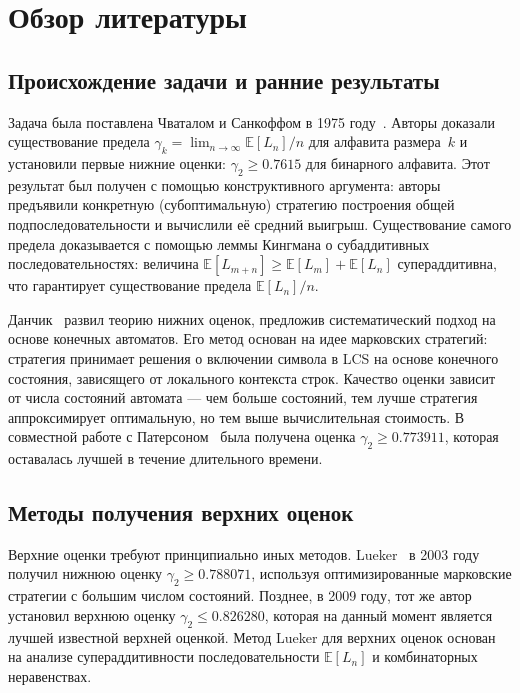 \documentclass[12pt,a4paper]{article}
\begin{document}
\section{Обзор литературы}

\subsection{Происхождение задачи и ранние результаты}

Задача была поставлена Чваталом и Санкоффом в 1975 году~\cite{chvatal1975}.
Авторы доказали существование предела $\gamma_k = \lim_{n \to \infty} \mathbb{E}[L_n]/n$ для алфавита размера~$k$ и установили первые нижние оценки: $\gamma_2 \geq 0.7615$ для бинарного алфавита.
Этот результат был получен с помощью конструктивного аргумента: авторы предъявили конкретную (субоптимальную) стратегию построения общей подпоследовательности и вычислили её средний выигрыш.
Существование самого предела доказывается с помощью леммы Кингмана о субаддитивных последовательностях: величина $\mathbb{E}[L_{m+n}] \geq \mathbb{E}[L_m] + \mathbb{E}[L_n]$ суперадди\-тивна, что гарантирует существование предела $\mathbb{E}[L_n]/n$.

Данчик~\cite{dancik1994} развил теорию нижних оценок, предложив систематический подход на основе конечных автоматов.
Его метод основан на идее марковских стратегий: стратегия принимает решения о включении символа в LCS на основе конечного состояния, зависящего от локального контекста строк.
Качество оценки зависит от числа состояний автомата --- чем больше состояний, тем лучше стратегия аппроксимирует оптимальную, но тем выше вычислительная стоимость.
В совместной работе с Патерсоном~\cite{dancik1995} была получена оценка $\gamma_2 \geq 0.773911$, которая оставалась лучшей в течение длительного времени.

\subsection{Методы получения верхних оценок}

Верхние оценки требуют принципиально иных методов.
Lueker~\cite{lueker2003} в 2003 году получил нижнюю оценку $\gamma_2 \geq 0.788071$, используя оптимизированные марковские стратегии с большим числом состояний.
Позднее, в 2009 году, тот же автор~\cite{lueker2009} установил верхнюю оценку $\gamma_2 \leq 0.826280$, которая на данный момент является лучшей известной верхней оценкой.
Метод Lueker для верхних оценок основан на анализе суперадди\-тивности последовательности $\mathbb{E}[L_n]$ и комбинаторных неравенствах.
\end{document}
